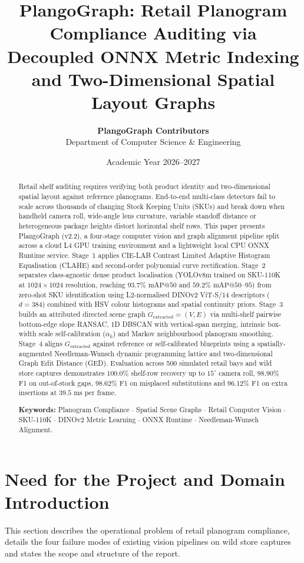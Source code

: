 \documentclass[10pt,a4paper]{article}
\title{\large\textbf{PlangoGraph: Retail Planogram Compliance Auditing via Decoupled ONNX Metric Indexing and Two-Dimensional Spatial Layout Graphs}}
\author{
\normalsize\textbf{PlangoGraph Contributors}\\
\small Department of Computer Science \& Engineering
}
\date{\small Academic Year 2026--2027}
\begin{document}
\maketitle
\thispagestyle{fancy}

\begin{abstract}
\noindent Retail shelf auditing requires verifying both product identity and two-dimensional spatial layout against reference planograms. End-to-end multi-class detectors fail to scale across thousands of changing Stock Keeping Units (SKUs) and break down when handheld camera roll, wide-angle lens curvature, variable standoff distance or heterogeneous package heights distort horizontal shelf rows. This paper presents PlangoGraph (v2.2), a four-stage computer vision and graph alignment pipeline split across a cloud L4 GPU training environment and a lightweight local CPU ONNX Runtime service. Stage~1 applies CIE-LAB Contrast Limited Adaptive Histogram Equalisation (CLAHE) and second-order polynomial curve rectification. Stage~2 separates class-agnostic dense product localisation (YOLOv8m trained on SKU-110K at $1024\times 1024$ resolution, reaching $93.7\%$ $\text{mAP}@50$ and $59.2\%$ $\text{mAP}@50\text{--}95$) from zero-shot SKU identification using L2-normalised DINOv2 ViT-S/14 descriptors ($d=384$) combined with HSV colour histograms and spatial continuity priors. Stage~3 builds an attributed directed scene graph $G_{\text{extracted}} = (V, E)$ via multi-shelf pairwise bottom-edge slope RANSAC, 1D DBSCAN with vertical-span merging, intrinsic box-width scale self-calibration ($\alpha_k$) and Markov neighbourhood planogram smoothing. Stage~4 aligns $G_{\text{extracted}}$ against reference or self-calibrated blueprints using a spatially-augmented Needleman-Wunsch dynamic programming lattice and two-dimensional Graph Edit Distance (GED). Evaluation across 500 simulated retail bays and wild store captures demonstrates $100.0\%$ shelf-row recovery up to $15^\circ$ camera roll, $98.90\%$ F1 on out-of-stock gaps, $98.62\%$ F1 on misplaced substitutions and $96.12\%$ F1 on extra insertions at $39.5\text{ ms}$ per frame.

\vspace{4pt}
\noindent\textbf{Keywords:} Planogram Compliance $\cdot$ Spatial Scene Graphs $\cdot$ Retail Computer Vision $\cdot$ SKU-110K $\cdot$ DINOv2 Metric Learning $\cdot$ ONNX Runtime $\cdot$ Needleman-Wunsch Alignment.
\end{abstract}

\section{Need for the Project and Domain Introduction}
This section describes the operational problem of retail planogram compliance, details the four failure modes of existing vision pipelines on wild store captures and states the scope and structure of the report.
\end{document}
